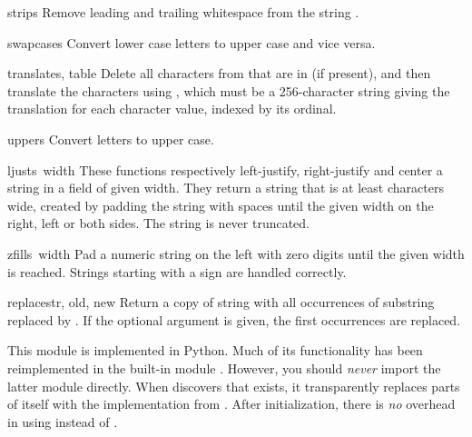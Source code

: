 \begin{funcdesc}{strip}{s}
Remove leading and trailing whitespace from the string .
\end{funcdesc}

\begin{funcdesc}{swapcase}{s}
Convert lower case letters to upper case and vice versa.
\end{funcdesc}

\begin{funcdesc}{translate}{s, table}
Delete all characters from  that are in  (if present), and 
then translate the characters using , which must be
a 256-character string giving the translation for each character
value, indexed by its ordinal.  
\end{funcdesc}

\begin{funcdesc}{upper}{s}
Convert letters to upper case.
\end{funcdesc}

\begin{funcdesc}{ljust}{s\, width}
These functions respectively left-justify, right-justify and center a
string in a field of given width.
They return a string that is at least
characters wide, created by padding the string
with spaces until the given width on the right, left or both sides.
The string is never truncated.
\end{funcdesc}

\begin{funcdesc}{zfill}{s\, width}
Pad a numeric string on the left with zero digits until the given
width is reached.  Strings starting with a sign are handled correctly.
\end{funcdesc}

\begin{funcdesc}{replace}{str, old, new}
Return a copy of string  with all occurrences of substring
 replaced by .  If the optional argument
 is given, the first  occurrences are
replaced.
\end{funcdesc}

This module is implemented in Python.  Much of its functionality has
been reimplemented in the built-in module .  However, you
should \emph{never} import the latter module directly.  When
 discovers that  exists, it transparently
replaces parts of itself with the implementation from .
After initialization, there is \emph{no} overhead in using
 instead of .
